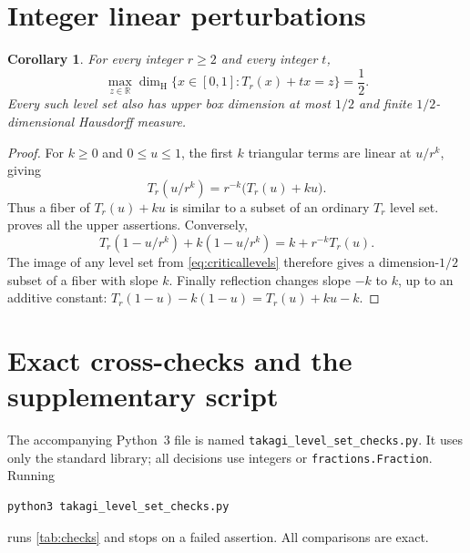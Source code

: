 \documentclass[11pt]{article}
\newtheorem{corollary}[theorem]{Corollary}
\theoremstyle{definition}
\theoremstyle{remark}
\newcommand{\R}{\mathbb R}
\newcommand{\dimH}{\dim_{\mathrm H}}
\begin{document}
\section{Integer linear perturbations}
\begin{corollary}\label{cor:integer}
For every integer $r\ge2$ and every integer $t$,
\[
 \max_{z\in\R}\dimH\{x\in[0,1]:T_r(x)+tx=z\}=\frac12.
\]
Every such level set also has upper box dimension at most $1/2$ and
finite $1/2$-dimensional Hausdorff measure.
\end{corollary}
\begin{proof}
For $k\ge0$ and $0\le u\le1$, the first $k$ triangular terms are linear
at $u/r^k$, giving
\begin{equation}\label{eq:integertilt}
 T_r(u/r^k)=r^{-k}\bigl(T_r(u)+ku\bigr).
\end{equation}
Thus a fiber of $T_r(u)+ku$ is similar to a subset of an ordinary
$T_r$ level set.  proves all the upper assertions.
Conversely,
\[
 T_r(1-u/r^k)+k(1-u/r^k)=k+r^{-k}T_r(u).
\]
The image of any level set from \cref{eq:criticallevels} therefore gives
a dimension-$1/2$ subset of a fiber with slope $k$.
Finally reflection changes slope $-k$ to $k$, up to an additive constant:
$T_r(1-u)-k(1-u)=T_r(u)+ku-k$.
\end{proof}

\section{Exact cross-checks and the supplementary script}\label{sec:verification}
The accompanying Python~3 file is named
\texttt{takagi\_level\_set\_checks.py}. It uses only the standard library;
all decisions use integers or \texttt{fractions.Fraction}. Running
\begin{lstlisting}
python3 takagi_level_set_checks.py
\end{lstlisting}
runs \cref{tab:checks} and stops on a failed assertion. All comparisons
are exact.
\end{document}
